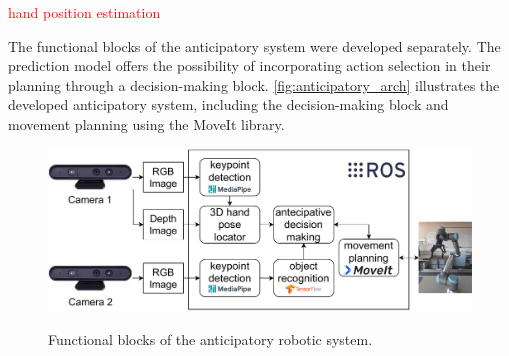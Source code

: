 \textcolor{red}{hand position estimation}

The functional blocks of the anticipatory system were developed separately. The prediction model offers the possibility of incorporating action selection in their planning through a decision-making block. \autoref{fig:anticipatory_arch} illustrates the developed anticipatory system, including the decision-making block and movement planning using the MoveIt library.

\begin{figure}[H] %
    \centering
    {\fontsize{10}{12}\selectfont\includegraphics[width=1\textwidth]{figs/AnticipationArchitecture.pdf}}
    \caption{Functional blocks of the anticipatory robotic system.}
    \label{fig:anticipatory_arch}
\end{figure}
